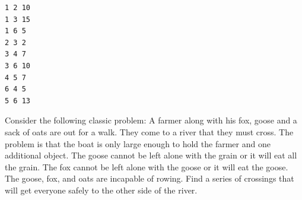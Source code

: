 \documentclass[11pt]{exam}
\begin{document}
\begin{questions}
\begin{verbatim}
1 2 10
1 3 15
1 6 5
2 3 2
3 4 7
3 6 10
4 5 7
6 4 5
5 6 13
\end{verbatim}




\newpage
\question  Consider the following classic problem:  A farmer along with his fox, goose and a sack of oats are out for a walk.  They come to a river that they must cross.  The problem is that the boat is only large enough to hold the farmer and one additional object.  The goose cannot be left alone with the grain or it will eat all the grain.  The fox cannot be left alone with the goose or it will eat the goose.  The goose, fox, and oats are incapable of rowing.  Find a series  of crossings that will get everyone safely to the other side of the river.


\end{questions}
\end{document}
